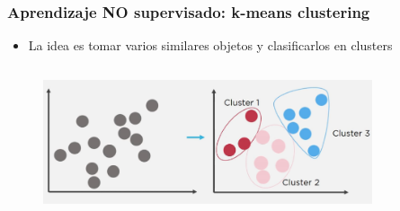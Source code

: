 \documentclass[10pt]{beamer}
\begin{document}
\begin{frame}
\frametitle{Aprendizaje NO supervisado: k-means clustering}
\begin{beamerboxesrounded}[upper=uppercolor, lower=lowercolor, shadow=true]{} 

\begin{itemize}
 \item La idea es tomar varios similares objetos y clasificarlos en clusters
   
\end{itemize}
\end{beamerboxesrounded}

\begin{columns}

\hspace{5mm}
\hspace{5mm}
\begin{column}{\textwidth}
 \begin{figure}
 \includegraphics[scale=0.35]{./Figures/cluster.png} 
 \end{figure}
\end{column}%

\begin{column}{.33\textwidth}
 \begin{figure}
 \end{figure}  
\end{column}%

\end{columns}

\end{frame}
\end{document}

